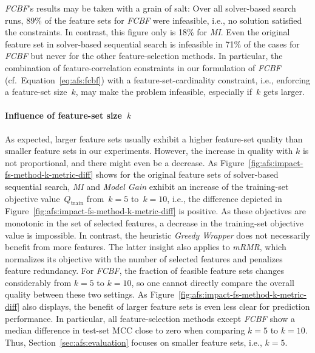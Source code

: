 \documentclass{article}
\theoremstyle{definition}
\begin{document}
\emph{FCBF}'s results may be taken with a grain of salt:
Over all solver-based search runs, 89\% of the feature sets for \emph{FCBF} were infeasible, i.e., no solution satisfied the constraints.
In contrast, this figure only is 18\% for \emph{MI}.
Even the original feature set in solver-based sequential search is infeasible in 71\% of the cases for \emph{FCBF} but never for the other feature-selection methods.
In particular, the combination of feature-correlation constraints in our formulation of \emph{FCBF} (cf.~Equation~\ref{eq:afs:fcbf}) with a feature-set-cardinality constraint, i.e., enforcing a feature-set size~$k$, may make the problem infeasible, especially if~$k$ gets larger.

\paragraph{Influence of feature-set size~$k$}

As expected, larger feature sets usually exhibit a higher feature-set quality than smaller feature sets in our experiments.
However, the increase in quality with $k$ is not proportional, and there might even be a decrease.
As Figure~\ref{fig:afs:impact-fs-method-k-metric-diff} shows for the original feature sets of solver-based sequential search, \emph{MI} and \emph{Model Gain} exhibit an increase of the training-set objective value~$Q_\text{train}$ from~$k=5$ to~$k=10$, i.e., the difference depicted in Figure~\ref{fig:afs:impact-fs-method-k-metric-diff} is positive.
As these objectives are monotonic in the set of selected features, a decrease in the training-set objective value is impossible.
In contrast, the heuristic \emph{Greedy Wrapper} does not necessarily benefit from more features.
The latter insight also applies to \emph{mRMR}, which normalizes its objective with the number of selected features and penalizes feature redundancy.
For \emph{FCBF}, the fraction of feasible feature sets changes considerably from $k=5$ to $k=10$, so one cannot directly compare the overall quality between these two settings.
As Figure~\ref{fig:afs:impact-fs-method-k-metric-diff} also displays, the benefit of larger feature sets is even less clear for prediction performance.
In particular, all feature-selection methods except \emph{FCBF} show a median difference in test-set MCC close to zero when comparing $k=5$ to $k=10$.
Thus, Section~\ref{sec:afs:evaluation} focuses on smaller feature sets, i.e., $k=5$.

\renewcommand*{\bibfont}{\small} %
\printbibliography
\end{document}
